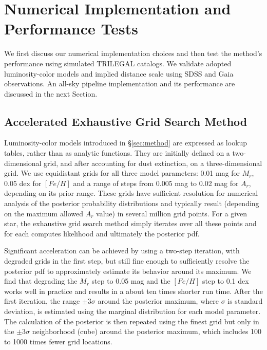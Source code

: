 % 

\section{Numerical Implementation and Performance Tests \label{sec:tests}}

We first discuss our numerical implementation choices and then test the method's performance using simulated TRILEGAL catalogs. We
validate adopted luminosity-color models and implied distance scale using SDSS and Gaia observations. An all-sky pipeline implementation
and its performance are discussed in the next Section. 

\subsection{Accelerated Exhaustive Grid Search Method}

Luminosity-color models introduced in \S\ref{sec:method} are expressed as lookup tables, rather than as analytic functions. They are initially defined
on a two-dimensional grid, and after accounting for dust extinction, on a three-dimensional grid. We use equidistant grids for all three
model parameters: 0.01 mag for $M_r$, 0.05 dex for $[Fe/H]$ and a range of steps from 0.005 mag to 0.02 mag for $A_r$, depending on its
prior range. These grids have sufficient resolution for numerical analysis of the posterior probability distributions and typically
result (depending on the maximum allowed $A_r$ value) in several
million grid points. For a given star, the exhaustive grid search method simply iterates
over all these points and for each computes likelihood and ultimately the posterior pdf. 

Significant acceleration can be achieved by using a two-step iteration, with degraded grids in the first step, but still fine
enough to sufficiently resolve the posterior pdf to approximately estimate its behavior around its maximum. We find that degrading the
$M_r$ step to 0.05 mag and the $[Fe/H]$ step to 0.1 dex works well in practice and results in a about ten times shorter run time. After the first iteration, the range $\pm 3
\sigma$ around the posterior  maximum, where $\sigma$ is standard deviation, is estimated using the marginal distribution for each model
parameter. The calculation of the posterior is then repeated using the finest grid but only in the $\pm 3 \sigma$  neighborhood
(cube) around the posterior maximum, which includes 100 to 1000 times fewer grid locations. 

